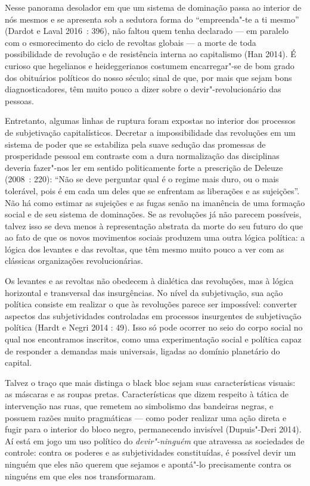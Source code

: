 Nesse panorama desolador em que um sistema de dominação passa ao
interior de nós mesmos e se apresenta sob a sedutora forma do
``empreenda"-te a ti mesmo'' (Dardot e Laval 2016~: 396), não faltou quem
tenha declarado --- em paralelo com o esmorecimento do ciclo de revoltas
globais --- a morte de toda possibilidade de revolução e de resistência
interna ao capitalismo (Han 2014). É curioso que hegelianos e
heideggerianos costumem encarregar"-se de bom grado dos obituários
políticos do nosso século; sinal de que, por mais que sejam bons
diagnosticadores, têm muito pouco a dizer sobre o devir"-revolucionário
das pessoas.

Entretanto, algumas linhas de ruptura foram expostas no interior dos
processos de subjetivação capitalísticos. Decretar a impossibilidade das
revoluções em um sistema de poder que se estabiliza pela suave sedução
das promessas de prosperidade pessoal em contraste com a dura
normalização das disciplinas deveria fazer"-nos ler em sentido
politicamente forte a prescrição de Deleuze (2008~: 220): ``Não se deve
perguntar qual é o regime mais duro, ou o mais tolerável, pois é em cada
um deles que se enfrentam as liberações e as sujeições''. Não há como
estimar as sujeições e as fugas senão na imanência de uma formação
social e de seu sistema de dominações. Se as revoluções já não parecem
possíveis, talvez isso se deva menos à representação abstrata da morte
do seu futuro do que ao fato de que os novos movimentos sociais produzem
uma outra lógica política: a lógica dos levantes e das revoltas, que têm
mesmo muito pouco a ver com as clássicas organizações revolucionárias.

Os levantes e as revoltas não obedecem à dialética das revoluções, mas à
lógica horizontal e transversal das insurgências. No nível da
subjetivação, sua ação política consiste em realizar o que às revoluções
parece ser impossível: converter aspectos das subjetividades controladas
em processos insurgentes de subjetivação política (Hardt e Negri 2014 :
49). Isso só pode ocorrer no seio do corpo social no qual nos
encontramos inscritos, como uma experimentação social e política capaz
de responder a demandas mais universais, ligadas ao domínio planetário
do capital.

Talvez o traço que mais distinga o black bloc sejam suas
características visuais: as máscaras e as roupas pretas. Características
que dizem respeito à tática de intervenção nas ruas, que remetem ao
simbolismo das bandeiras negras, e possuem razões muito pragmáticas ---
como poder realizar uma ação direta e fugir para o interior do bloco
negro, permanecendo invisível (Dupuis"-Deri 2014). Aí está em jogo um uso
político do \emph{devir"-ninguém }que atravessa as sociedades de
controle: contra os poderes e as subjetividades constituídas, é possível
devir um ninguém que eles não querem que sejamos e apontá"-lo
precisamente contra os ninguéns em que eles nos transformaram.

